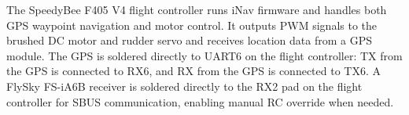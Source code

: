 The SpeedyBee F405 V4 flight controller runs iNav firmware and handles both GPS waypoint navigation and motor control. It outputs PWM signals to the brushed DC motor and rudder servo and receives location data from a GPS module. The GPS is soldered directly to UART6 on the flight controller: TX from the GPS is connected to RX6, and RX from the GPS is connected to TX6. A FlySky FS-iA6B receiver is soldered directly to the RX2 pad on the flight controller for SBUS communication, enabling manual RC override when needed.